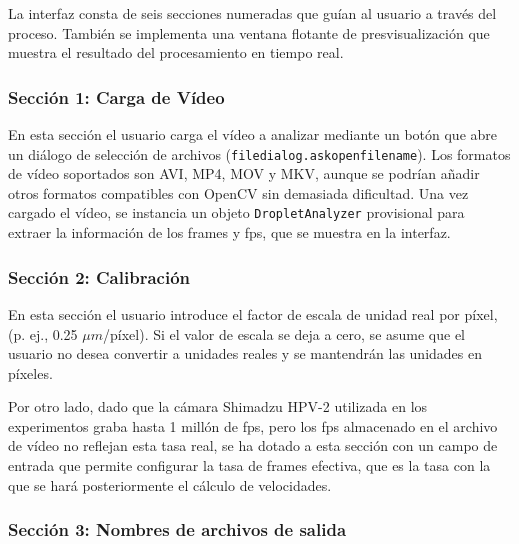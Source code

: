 La interfaz consta de seis secciones numeradas que guían al usuario a través del proceso. También se implementa una ventana flotante de presvisualización que muestra el resultado del procesamiento en tiempo real.

\subsubsection{Sección 1: Carga de Vídeo}

En esta sección el usuario carga el vídeo a analizar mediante un botón que abre un diálogo de selección de archivos (\texttt{filedialog.askopenfilename}). Los formatos de vídeo soportados son AVI, MP4, MOV y MKV, aunque se podrían añadir otros formatos compatibles con OpenCV sin demasiada dificultad. Una vez cargado el vídeo, se instancia un objeto \texttt{DropletAnalyzer} provisional para extraer la información de los frames y fps, que se muestra en la interfaz.

\subsubsection{Sección 2: Calibración}
En esta sección el usuario introduce el factor de escala de unidad real por píxel, (p. ej., 0.25 $\mu m$/píxel). Si el valor de escala se deja a cero, se asume que el usuario no desea convertir a unidades reales y se mantendrán las unidades en píxeles.

Por otro lado, dado que la cámara Shimadzu HPV-2 utilizada en los experimentos graba hasta 1 millón de fps, pero los fps almacenado en el archivo de vídeo no reflejan esta tasa real, se ha dotado a esta sección con un campo de entrada que permite configurar la tasa de frames efectiva, que es la tasa con la que se hará posteriormente el cálculo de velocidades. 

\subsubsection{Sección 3: Nombres de archivos de salida}

